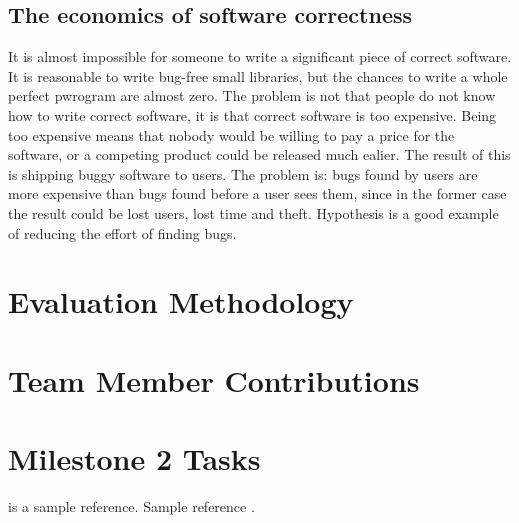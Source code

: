 \documentclass[preprint,nocopyrightspace]{sig-alternate}
\begin{document}
\subsection{The economics of software correctness}
It is almost impossible for someone to write a significant piece of correct software. It is reasonable to write bug-free small libraries, but the chances to write a whole perfect pwrogram are almost zero. The problem is not that people do not know how to write correct software, it is that correct software is too expensive. Being too expensive means that nobody would be willing to pay a price for the software, or a competing product could be released much ealier. The result of this is shipping buggy software to users. The problem is: bugs found by users are more expensive than bugs found before a user sees them, since in the former case the result could be lost users, lost time and theft. Hypothesis is a good example of reducing the effort of finding bugs.

\section{Evaluation Methodology}

\section{Team Member Contributions}

\section{Milestone 2 Tasks}

\citet{DBLP:conf/sc/Rubio-GonzalezNNDKSBIH13} is a sample reference.
Sample reference \cite{DBLP:conf/sc/Rubio-GonzalezNNDKSBIH13}.


\end{document}
